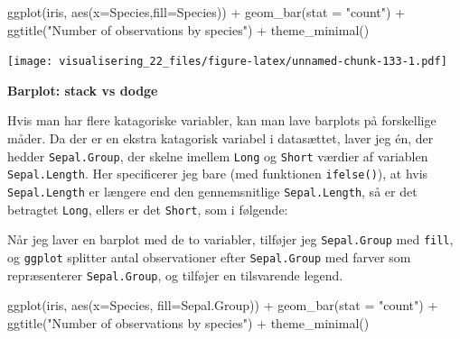 \documentclass[
]{book}
\newenvironment{Shaded}{\begin{snugshade}}{\end{snugshade}}
\newcommand{\AttributeTok}[1]{\textcolor[rgb]{0.77,0.63,0.00}{#1}}
\newcommand{\CommentTok}[1]{\textcolor[rgb]{0.56,0.35,0.01}{\textit{#1}}}
\newcommand{\FunctionTok}[1]{\textcolor[rgb]{0.00,0.00,0.00}{#1}}
\newcommand{\NormalTok}[1]{#1}
\newcommand{\OtherTok}[1]{\textcolor[rgb]{0.56,0.35,0.01}{#1}}
\newcommand{\SpecialCharTok}[1]{\textcolor[rgb]{0.00,0.00,0.00}{#1}}
\newcommand{\StringTok}[1]{\textcolor[rgb]{0.31,0.60,0.02}{#1}}
\begin{document}
\begin{Shaded}
\begin{Highlighting}[]
\FunctionTok{ggplot}\NormalTok{(iris, }\FunctionTok{aes}\NormalTok{(}\AttributeTok{x=}\NormalTok{Species,}\AttributeTok{fill=}\NormalTok{Species)) }\SpecialCharTok{+} 
  \FunctionTok{geom\_bar}\NormalTok{(}\AttributeTok{stat =} \StringTok{"count"}\NormalTok{) }\SpecialCharTok{+}
  \FunctionTok{ggtitle}\NormalTok{(}\StringTok{"Number of observations by species"}\NormalTok{) }\SpecialCharTok{+}
  \FunctionTok{theme\_minimal}\NormalTok{()}
\end{Highlighting}
\end{Shaded}

\texttt{[image: visualisering\_22\_files/figure-latex/unnamed-chunk-133-1.pdf]}

\textbf{Barplot: stack vs dodge}

Hvis man har flere katagoriske variabler, kan man lave barplots på forskellige måder. Da der er en ekstra katagorisk variabel i datasættet, laver jeg én, der hedder \texttt{Sepal.Group}, der skelne imellem \texttt{Long} og \texttt{Short} værdier af variablen \texttt{Sepal.Length}. Her specificerer jeg bare (med funktionen \texttt{ifelse()}), at hvis \texttt{Sepal.Length} er længere end den gennemsnitlige \texttt{Sepal.Length}, så er det betragtet \texttt{Long}, ellers er det \texttt{Short}, som i følgende:

\begin{Shaded}
\end{Shaded}

Når jeg laver en barplot med de to variabler, tilføjer jeg \texttt{Sepal.Group} med \texttt{fill}, og \texttt{ggplot} splitter antal observationer efter \texttt{Sepal.Group} med farver som repræsenterer \texttt{Sepal.Group}, og tilføjer en tilsvarende legend.

\begin{Shaded}
\begin{Highlighting}[]
\FunctionTok{ggplot}\NormalTok{(iris, }\FunctionTok{aes}\NormalTok{(}\AttributeTok{x=}\NormalTok{Species, }\AttributeTok{fill=}\NormalTok{Sepal.Group)) }\SpecialCharTok{+} 
  \FunctionTok{geom\_bar}\NormalTok{(}\AttributeTok{stat =} \StringTok{"count"}\NormalTok{) }\SpecialCharTok{+}
  \FunctionTok{ggtitle}\NormalTok{(}\StringTok{"Number of observations by species"}\NormalTok{) }\SpecialCharTok{+}
  \FunctionTok{theme\_minimal}\NormalTok{()}
\end{Highlighting}
\end{Shaded}
\end{document}
